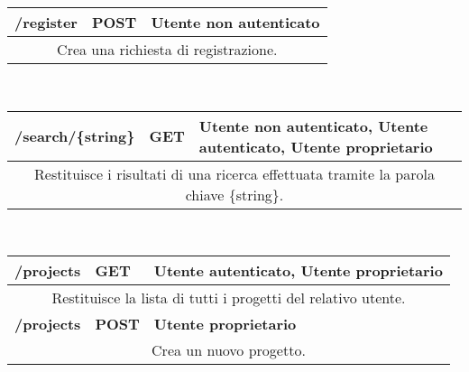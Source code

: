 \begin{table}[h]
	\begin{tabular}{|p{}|p{}|p{}|}
		\toprule
		\textbf{/register} & \textbf{POST} & \textbf{Utente non autenticato} \\ \midrule
		\multicolumn{3}{|c|}{Crea una richiesta di registrazione.} \\
		\bottomrule
	\end{tabular}\\
	\par\bigskip
	
	\begin{tabular}{|p{}|p{}|p{}|}
		\toprule
		\textbf{/search/\{string\}} & \textbf{GET} & \textbf{Utente non autenticato, Utente autenticato, Utente proprietario} \\ \midrule
		\multicolumn{3}{|c|}{Restituisce i risultati di una ricerca effettuata tramite la parola chiave \{string\}.} \\
		\bottomrule
	\end{tabular}\\
	\par\bigskip
	
	\begin{tabular}{|p{}|p{}|p{}|}
		\toprule
		\textbf{/projects} & \textbf{GET} & \textbf{Utente autenticato, Utente proprietario} \\ \midrule
		\multicolumn{3}{|c|}{Restituisce la lista di tutti i progetti del relativo utente.} \\
		\bottomrule
		\textbf{/projects} & \textbf{POST} & \textbf{Utente proprietario} \\ \midrule
		\multicolumn{3}{|c|}{Crea un nuovo progetto.} \\
		\bottomrule
	\end{tabular}
\end{table}
\newpage

